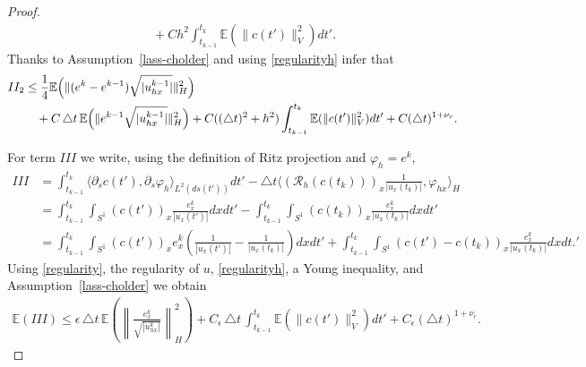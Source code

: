 \documentclass[a4paper,10pt]{article}
\numberwithin{equation}{section}
\begin{document}
\begin{proof}
\begin{align*}
& \quad + C h^{2} \int_{t_{k-1}}^{t_{k}} \mathbb{E}( \| c(t')\|^{2}_{V}) dt'.
\end{align*}
Thanks to Assumption~\ref{lass-cholder} and using \eqref{regularityh} infer that
\begin{align}\label{term-II2}
II_{2} & \leq 
\frac{1}{4} \mathbb{E}\Big(\| ( e^{k}-e^{k-1}) \sqrt{|u^{k-1}_{hx}|}\|_{H}^{2} \Big) \\
& \quad +
C \, \triangle t \, \mathbb{E} \Big{(} \| e^{k-1} \sqrt{|u^{k-1}_{hx}|} \|^{2}_{H} \Big{)} + C ((\triangle t)^{2}+h^{2}) \int_{t_{k-1}}^{t_{k}} \mathbb{E}( \| c(t')\|^{2}_{V}) dt'
 + C(\triangle t)^{1+\nu_{r}}. 
 \notag
\end{align}

For term $III$ we write, using the definition of Ritz projection and $\varphi_{h}=e^{k}$,
\begin{align*}
III&=\int_{t_{k-1}}^{t_{k}} \langle \partial_{s} c(t'), \partial_{s} \varphi_{h} \rangle_{L^{2}(ds(t'))} dt' -\triangle t \langle (\mathcal{R}_{h}(c(t_{k})))_{x} \frac{1}{| u_{x}(t_{k})|}, \varphi_{hx} \rangle_{H} \\
&= \int_{t_{k-1}}^{t_{k}} \int_{S^{1}} (c(t'))_{x} \frac{e^{k}_{x}}{|u_{x}(t')|} dx dt'-
\int_{t_{k-1}}^{t_{k}} \int_{S^{1}} (c(t_{k}))_{x} \frac{e^{k}_{x}}{|u_{x}(t_{k})|} dx dt'\\
& =\int_{t_{k-1}}^{t_{k}} \int_{S^{1}} (c(t') )_{x} e^{k}_{x} ( \frac{1}{|u_{x}(t')|} - \frac{1}{|u_{x}(t_{k})|} ) dx dt'
+ \int_{t_{k-1}}^{t_{k}} \int_{S^{1}} ( c(t')-c(t_{k}))_{x} \frac{e^{k}_{x}}{|u_{x}(t_{k})|} dx dt.'
\end{align*}
Using \eqref{regularity}, the regularity of $u$, \eqref{regularityh}, a Young inequality, and Assumption~\ref{lass-cholder} we obtain
\begin{align}\label{term3}
\mathbb{E}(III) \leq \epsilon \, \triangle t \, \mathbb{E} \left (\left \| \frac{e_{x}^{k}}{\sqrt{|u^{k}_{hx}| } } \right \| ^{2}_{H} \right) + C_{\epsilon} \, \triangle t \,\int_{t_{k-1}}^{t_{k}} \mathbb{E} ( \|c(t')\|^{2}_{V} ) dt' +C_{\epsilon} (\triangle t)^{1+\nu_{r}}.
\end{align}


\end{proof}
\end{document}
